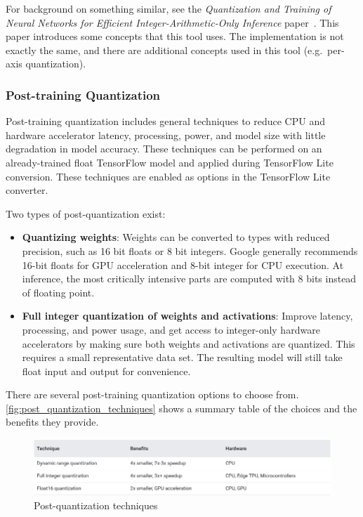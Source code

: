 For background on something similar, see the \textit{Quantization and Training
of Neural Networks for Efficient Integer-Arithmetic-Only Inference}
paper~\cite{Jacob_2018}.
This paper introduces some concepts that this tool uses.
The implementation is not exactly the same, and there are additional concepts
used in this tool (e.g.\ per-axis quantization).~\cite{tfmot:quantization_training}

\subsubsection{Post-training Quantization}
Post-training quantization includes general techniques to reduce CPU and
hardware accelerator latency, processing, power, and model size with little
degradation in model accuracy. These techniques can be performed on an
already-trained float TensorFlow model and applied during TensorFlow Lite
conversion. These techniques are enabled as options in the TensorFlow Lite
converter.

Two types of post-quantization exist:
\begin{itemize}
    \item \textbf{Quantizing weights}: Weights can be converted to types with
        reduced precision, such as 16 bit floats or 8 bit integers. Google
        generally recommends 16-bit floats for GPU acceleration and 8-bit
        integer for CPU execution. At inference, the most critically intensive
        parts are computed with 8 bits instead of floating point.
    \item \textbf{Full integer quantization of weights and activations}:
        Improve latency, processing, and power usage, and get access to
        integer-only hardware accelerators by making sure both weights and
        activations are quantized.  This requires a small representative data
        set. The resulting model will still take float input and output for
        convenience.
\end{itemize}

There are several post-training quantization options to choose from.
\autoref{fig:post_quantization_techniques} shows a summary table of the choices
and the benefits they provide.~\cite{tfmot:quantization_post_training}

\begin{figure}[ht]
    \includegraphics[width=\textwidth]{images/introduction/post_quantization_techniques.png}
    \centering
    \caption{Post-quantization techniques}\label{fig:post_quantization_techniques}
\end{figure}

